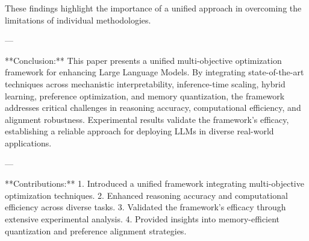 These findings highlight the importance of a unified approach in overcoming the limitations of individual methodologies.  

---

**Conclusion:**  
This paper presents a unified multi-objective optimization framework for enhancing Large Language Models. By integrating state-of-the-art techniques across mechanistic interpretability, inference-time scaling, hybrid learning, preference optimization, and memory quantization, the framework addresses critical challenges in reasoning accuracy, computational efficiency, and alignment robustness. Experimental results validate the framework's efficacy, establishing a reliable approach for deploying LLMs in diverse real-world applications.  

---

**Contributions:**  
1. Introduced a unified framework integrating multi-objective optimization techniques.  
2. Enhanced reasoning accuracy and computational efficiency across diverse tasks.  
3. Validated the framework's efficacy through extensive experimental analysis.  
4. Provided insights into memory-efficient quantization and preference alignment strategies.  

